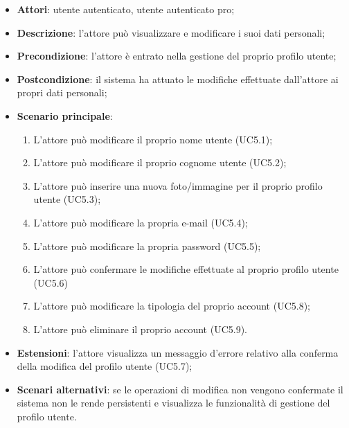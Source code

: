 \begin{itemize}
	\item \textbf{Attori}: utente autenticato, utente autenticato pro;
	\item \textbf{Descrizione}: l'attore può visualizzare e modificare i suoi dati personali;
	\item \textbf{Precondizione}: l'attore è entrato nella gestione del proprio profilo utente;
	\item \textbf{Postcondizione}: il sistema ha attuato le modifiche effettuate dall'attore ai propri dati personali;
	\item \textbf{Scenario principale}:
		\begin{enumerate}
			\item L'attore può modificare il proprio nome utente (UC5.1);
			\item L'attore può modificare il proprio cognome utente (UC5.2);
			\item L'attore può inserire una nuova foto/immagine per il proprio profilo utente (UC5.3);
			\item L'attore può modificare la propria e-mail (UC5.4);
			\item L'attore può modificare la propria password (UC5.5);
			\item L'attore può confermare le modifiche effettuate al proprio profilo utente (UC5.6)
			\item L'attore può modificare la tipologia del proprio account (UC5.8);
			\item L'attore può eliminare il proprio account (UC5.9).
		\end{enumerate} 
	\item \textbf{Estensioni}: l'attore visualizza un messaggio d'errore relativo alla conferma della modifica del profilo utente	(UC5.7);	
	\item \textbf{Scenari alternativi}: se le operazioni di modifica non vengono confermate il sistema non le rende persistenti e visualizza le funzionalità di gestione del profilo utente. 
\end{itemize}

